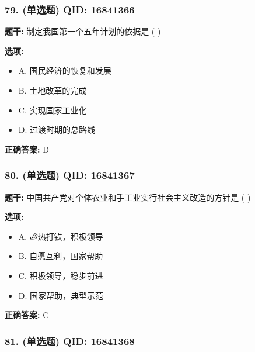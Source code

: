\documentclass[12pt,UTF8]{ctexart}
\begin{document}
\subsubsection*{79. (单选题) \small QID: 16841366}

\textbf{题干:}
制定我国第一个五年计划的依据是 ( )

\textbf{选项:}
\begin{itemize}[leftmargin=*]

  \item A. 国民经济的恢复和发展

  \item B. 土地改革的完成

  \item C. 实现国家工业化

  \item D. 过渡时期的总路线

\end{itemize}

\textbf{正确答案:}
D

\vspace{0.3em}\hrulefill\vspace{0.7em}

\subsubsection*{80. (单选题) \small QID: 16841367}

\textbf{题干:}
中国共产党对个体农业和手工业实行社会主义改造的方针是 ( )

\textbf{选项:}
\begin{itemize}[leftmargin=*]

  \item A. 趁热打铁，积极领导

  \item B. 自愿互利，国家帮助

  \item C. 积极领导，稳步前进

  \item D. 国家帮助，典型示范

\end{itemize}

\textbf{正确答案:}
C

\vspace{0.3em}\hrulefill\vspace{0.7em}

\subsubsection*{81. (单选题) \small QID: 16841368}
\end{document}
